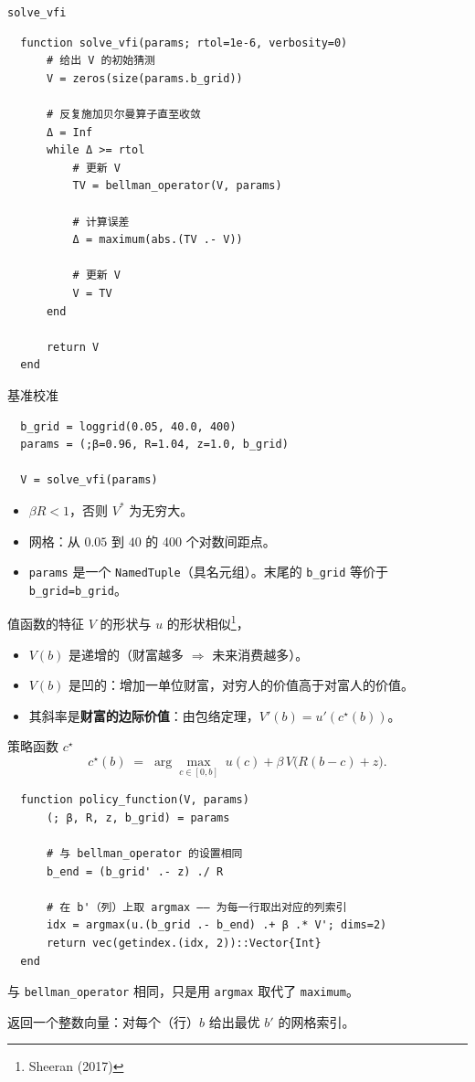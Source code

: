 \documentclass[10pt,aspectratio=169]{beamer}
\begin{document}
\begin{frame}[fragile]{\texttt{solve\_vfi}}
  \begin{lstlisting}
  function solve_vfi(params; rtol=1e-6, verbosity=0)
      # 给出 V 的初始猜测
      V = zeros(size(params.b_grid))

      # 反复施加贝尔曼算子直至收敛
      Δ = Inf
      while Δ >= rtol
          # 更新 V
          TV = bellman_operator(V, params)

          # 计算误差
          Δ = maximum(abs.(TV .- V))

          # 更新 V
          V = TV
      end

      return V
  end
  \end{lstlisting}
\end{frame}

\begin{frame}[fragile]{基准校准}
  \begin{lstlisting}
  b_grid = loggrid(0.05, 40.0, 400)
  params = (;β=0.96, R=1.04, z=1.0, b_grid)

  V = solve_vfi(params)
  \end{lstlisting}
  \begin{itemize}
    \item \small $\beta R < 1$，否则 $V^*$ 为无穷大。
    \item 网格：从 $0.05$ 到 $40$ 的 400 个对数间距点。
    \item \texttt{params} 是一个 \texttt{NamedTuple}（具名元组）。末尾的 \texttt{b\_grid} 等价于 \texttt{b\_grid=b\_grid}。
  \end{itemize}
\end{frame}

\begin{frame}{值函数的特征}
  $V$ 的形状与 $u$ 的形状相似\footnote{Sheeran (2017)}，
  \begin{itemize}
    \item $V(b)$ 是递增的（财富越多 $\Rightarrow$ 未来消费越多）。
    \item $V(b)$ 是凹的：增加一单位财富，对穷人的价值高于对富人的价值。
    \item 其斜率是\textbf{财富的边际价值}：由包络定理，$V'(b) = u'(c^\star(b))$。
  \end{itemize}
\end{frame}

\begin{frame}[fragile]{策略函数 $c^\star$}
  \[
    c^\star(b) \;=\; \arg\max_{c \in [0, b]} \; u(c) + \beta \, V\!\big(R(b - c) + z\big).
  \]
  \begin{lstlisting}
  function policy_function(V, params)
      (; β, R, z, b_grid) = params

      # 与 bellman_operator 的设置相同
      b_end = (b_grid' .- z) ./ R

      # 在 b'（列）上取 argmax —— 为每一行取出对应的列索引
      idx = argmax(u.(b_grid .- b_end) .+ β .* V'; dims=2)
      return vec(getindex.(idx, 2))::Vector{Int}
  end
  \end{lstlisting}
  与 \texttt{bellman\_operator} 相同，只是用 \texttt{argmax} 取代了 \texttt{maximum}。

  返回一个整数向量：对每个（行）$b$ 给出最优 $b'$ 的网格索引。
\end{frame}
\end{document}
